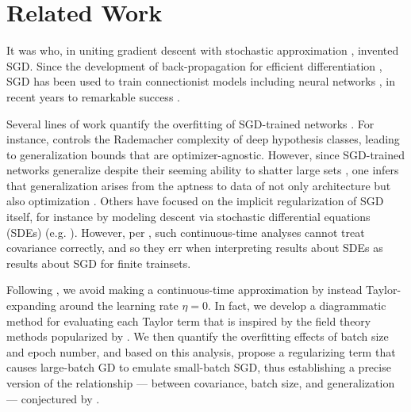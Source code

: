 \documentclass{article}
\theoremstyle{plain}
\theoremstyle{definition}
\begin{document}

\section{Related Work} \label{sect:related}


    It was \citet{ki52} who, in uniting gradient descent \citep{ca47} with
    stochastic approximation \citep{ro51}, invented SGD.  Since the development
    of back-propagation for efficient differentiation \citep{we74}, SGD
    has been used to train connectionist models including neural
    networks \citep{bo91}, in recent years to remarkable success \citep{le15}.


    Several lines of work quantify the overfitting of SGD-trained networks
    \citep{ne17a}.  For instance, \citet{ba17} controls the Rademacher
    complexity of deep hypothesis classes, leading to generalization bounds
    that are optimizer-agnostic.  However, since SGD-trained networks
    generalize despite their seeming ability to shatter large sets
    \citep{zh17}, one infers that generalization arises from the aptness to
    data of not only architecture but also optimization \citep{ne17b}.  Others
    have focused on the implicit regularization of SGD itself, for instance by
    modeling descent via stochastic differential equations (SDEs) (e.g.
    \citet{ch18}).  However, per \citet{ya19a}, such continuous-time analyses
    cannot treat covariance correctly, and so they err when interpreting
    results about SDEs as results about SGD for finite trainsets.


    Following
    \citet{ro18}, we avoid making a continuous-time
    approximation by instead Taylor-expanding around the learning rate
    $\eta=0$.  In fact, we develop a diagrammatic method for evaluating each
    Taylor term that is inspired by the field theory methods popularized by
    \citet{dy49a}.  We then quantify the overfitting effects
    of batch size and epoch number, and based on this analysis, propose a
    regularizing term that causes large-batch GD to emulate small-batch SGD,
    thus establishing a precise version of the relationship --- between
    covariance, batch size, and generalization --- conjectured by \citet{ja18}.  
    
\end{document}
